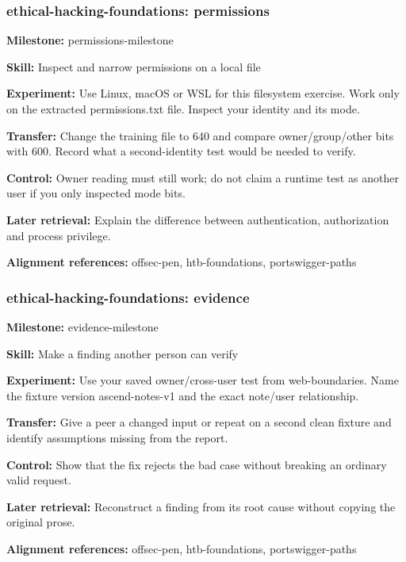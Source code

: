 \subsubsection{ethical-hacking-foundations: permissions}
\noindent\textbf{Milestone:} permissions-milestone\par
\noindent\textbf{Skill:} Inspect and narrow permissions on a local file\par
\noindent\textbf{Experiment:} Use Linux, macOS or WSL for this filesystem exercise. Work only on the extracted permissions.txt file. Inspect your identity and its mode.\par
\noindent\textbf{Transfer:} Change the training file to 640 and compare owner/group/other bits with 600. Record what a second-identity test would be needed to verify.\par
\noindent\textbf{Control:} Owner reading must still work; do not claim a runtime test as another user if you only inspected mode bits.\par
\noindent\textbf{Later retrieval:} Explain the difference between authentication, authorization and process privilege.\par
\noindent\textbf{Alignment references:} offsec-pen, htb-foundations, portswigger-paths\par
\subsubsection{ethical-hacking-foundations: evidence}
\noindent\textbf{Milestone:} evidence-milestone\par
\noindent\textbf{Skill:} Make a finding another person can verify\par
\noindent\textbf{Experiment:} Use your saved owner/cross-user test from web-boundaries. Name the fixture version ascend-notes-v1 and the exact note/user relationship.\par
\noindent\textbf{Transfer:} Give a peer a changed input or repeat on a second clean fixture and identify assumptions missing from the report.\par
\noindent\textbf{Control:} Show that the fix rejects the bad case without breaking an ordinary valid request.\par
\noindent\textbf{Later retrieval:} Reconstruct a finding from its root cause without copying the original prose.\par
\noindent\textbf{Alignment references:} offsec-pen, htb-foundations, portswigger-paths\par
